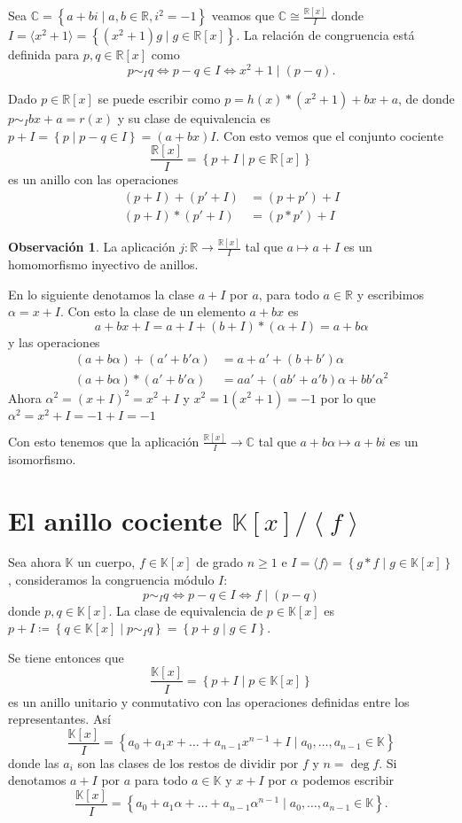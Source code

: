 \documentclass[10pt, spanish]{report}
\theoremstyle{definition}
\newtheorem*{obs}{Observación}
\newcommand{\R}{\mathbb{R}}
\newcommand{\C}{\mathbb{C}}
\newcommand{\K}{\mathbb{K}}
\renewcommand{\geq}{\geqslant}
\begin{document}
Sea $\C =\left\{ a+bi\mid a,b\in\R, i^2 = -1 \right\}$ veamos que $\C\cong
\frac{\R[x]}{I}$ donde $I=\langle x^2 +1\rangle=\left\{(x^2+1)g\mid g\in\R[x]
\right\}$. La relación de congruencia está definida para $p,q\in\R[x]$ como
\[p\sim_I q \Leftrightarrow p-q\in I\Leftrightarrow x^2+1\mid(p-q).\]

Dado $p\in\R[x]$ se puede escribir como $p=h(x)*(x^2+1)+bx+a$, de donde
$p\sim_I bx+a=r(x)$ y su clase de equivalencia es $p+I=\left\{ p\mid p-q\in
I\right\}=(a+bx)I$. Con esto vemos que el conjunto cociente
\[\frac{\R[x]}{I}=\left\{ p+I\mid p\in\R[x] \right\} \]
es un anillo con las operaciones
\begin{align*}
    (p+I)+(p'+I)&=(p+p')+I\\
    (p+I)*(p'+I)&=(p*p')+I
\end{align*}

\begin{obs}
    La aplicación $j:\R\to\frac{\R[x]}{I}$ tal que $a\mapsto a+I$ es un
    homomorfismo inyectivo de anillos.
\end{obs}

En lo siguiente denotamos la clase $a+I$ por $a$, para todo $a\in\R$ y
escribimos $\alpha = x+I$. Con esto la clase de un elemento $a+bx$ es
\[a+bx+I=a+I+(b+I)*(\alpha+I)=a+b\alpha\]
y las operaciones
\begin{align*}
    (a+b\alpha)+(a'+b'\alpha)&=a+a'+(b+b')\alpha\\
    (a+b\alpha)*(a'+b'\alpha)&=aa'+(ab'+a'b)\alpha+bb'\alpha^2
\end{align*}
Ahora $\alpha^2=(x+I)^2=x^2+I$ y $x^2=1(x^2+1)=-1$ por lo que $\alpha^2=x^2+I
=-1+I=-1$

Con esto tenemos que la aplicación $\frac{\R[x]}{I}\to \C$ tal que
$a+b\alpha\mapsto a+bi$ es un isomorfismo.

\section{El anillo cociente $\K[x]/\left<f\right>$}

Sea ahora $\K$ un cuerpo, $f\in\K[x]$ de grado $n\geq 1$ e $I=\langle f\rangle=
\left\{ g*f\mid g\in\K[x] \right\}$, consideramos la congruencia módulo $I$:
\[p\sim_I q\Leftrightarrow p-q\in I \Leftrightarrow f\mid(p-q)\]
donde $p,q\in\K[x]$. La clase de equivalencia de $p\in\K[x]$ es
$p+I\coloneqq\left\{q\in\K[x]\mid p\sim_Iq\right\}=\left\{p+g\mid g\in I\right\}$.

Se tiene entonces que \[\frac{\K[x]}{I}=\left\{ p+I\mid p\in\K[x] \right\}\] es un
anillo unitario y conmutativo con las operaciones definidas entre los
representantes. Así
\[\frac{\K[x]}{I}=\left\{ a_0+a_1x+\ldots+a_{n-1}x^{n-1}+I\mid a_0,\ldots,a_{n-1}
\in\K \right\}\]
donde las $a_i$ son las clases de los restos de dividir por $f$ y $n=\deg{f}$.
Si denotamos $a+I$ por $a$ para todo $a\in\K$ y $x+I$ por $\alpha$ podemos
escribir
\[\frac{\K[x]}{I}=\left\{ a_0+a_1\alpha+\ldots+a_{n-1}\alpha^{n-1}\mid a_0,\ldots,a_{n-1}
\in\K \right\}.\]
\end{document}
